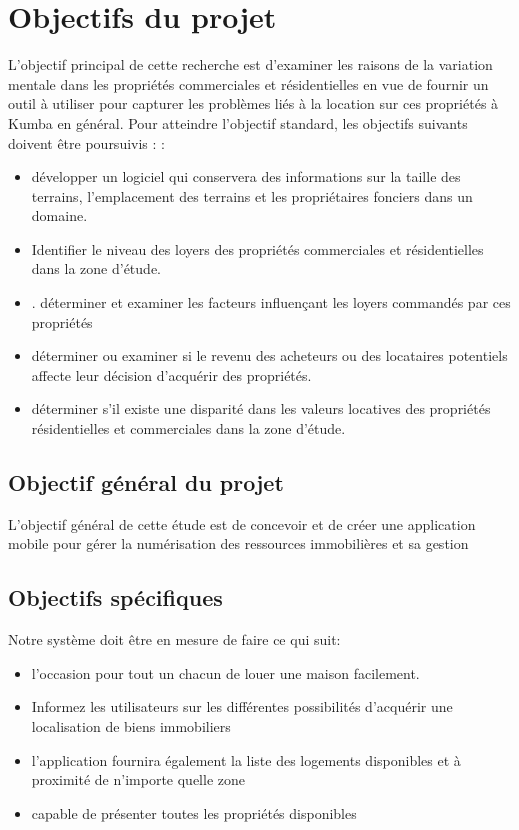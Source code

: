 \documentclass[english,12pt,a4paper]{report}
\begin{document}
\section{Objectifs du projet }
 L'objectif principal de cette recherche est d'examiner les raisons de la variation mentale dans les propriétés commerciales et résidentielles en vue de fournir un outil à utiliser pour capturer les problèmes liés à la location sur ces propriétés à Kumba en général. 
 Pour atteindre l'objectif standard, les objectifs suivants doivent être poursuivis : :
\begin{itemize}
	\item développer un logiciel qui conservera des informations sur la taille des terrains, l'emplacement des terrains et les propriétaires fonciers dans un domaine.
	\item  Identifier le niveau des loyers des propriétés commerciales et résidentielles dans la zone d'étude.
	\item . déterminer et examiner les facteurs influençant les loyers commandés par ces propriétés 
	\item déterminer ou examiner si le revenu des acheteurs ou des locataires potentiels affecte leur décision d'acquérir des propriétés.
	\item déterminer s'il existe une disparité dans les valeurs locatives des propriétés résidentielles et commerciales dans la zone d'étude.
\end{itemize}

\subsection{Objectif général du projet}

L'objectif général de cette étude est de concevoir et de créer une application mobile pour gérer la numérisation des ressources immobilières et sa gestion

\subsection{Objectifs spécifiques}
Notre système doit être en mesure de faire ce qui suit:
\begin{itemize}
	\item 	l'occasion pour tout un chacun de louer une maison facilement.
	\item 	 Informez les utilisateurs sur les différentes possibilités d'acquérir une localisation de biens immobiliers 
	\item l'application fournira également la liste des logements disponibles et à 	proximité de n'importe quelle zone 
	\item 	 capable de présenter toutes les propriétés disponibles
	
\end{itemize}
\end{document}
